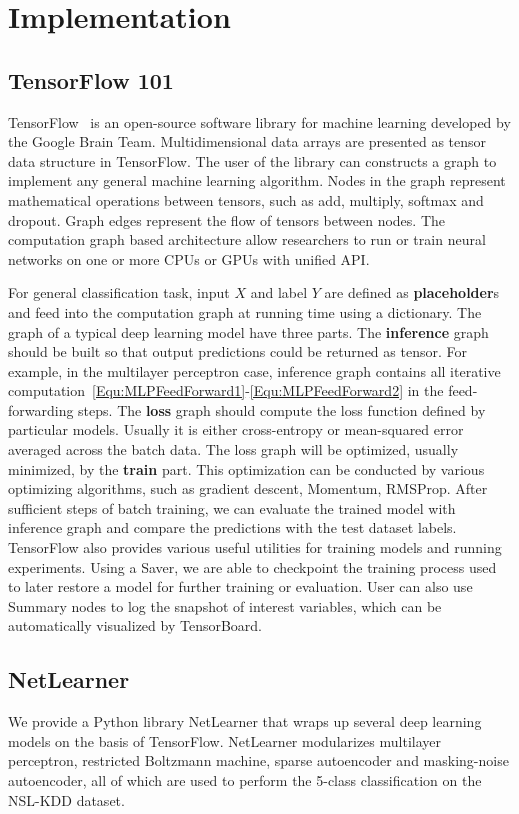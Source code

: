 \section{Implementation}

\subsection{TensorFlow 101}
TensorFlow~\cite{TensorFlow} is an open-source software library for machine learning developed by the Google Brain Team.
Multidimensional data arrays are presented as tensor data structure in TensorFlow.
The user of the library can constructs a graph to implement any general machine learning algorithm.
Nodes in the graph represent mathematical operations between tensors,
such as add, multiply, softmax and dropout.
Graph edges represent the flow of tensors between nodes.
The computation graph based architecture allow researchers to run or train neural networks
on one or more CPUs or GPUs with unified API.

For general classification task, input $X$ and label $Y$ are defined as \textbf{placeholder}s
and feed into the computation graph at running time using a dictionary.
The graph of a typical deep learning model have three parts.
The \textbf{inference} graph should be built so that output predictions could be returned as tensor.
For example, in the multilayer perceptron case, inference graph contains all iterative
computation~\ref{Equ:MLPFeedForward1}-\ref{Equ:MLPFeedForward2} in the feed-forwarding steps.
The \textbf{loss} graph should compute the loss function defined by particular models.
Usually it is either cross-entropy or mean-squared error averaged across the batch data.
The loss graph will be optimized, usually minimized, by the \textbf{train} part.
This optimization can be conducted by various optimizing algorithms, such as gradient descent,
Momentum, RMSProp.
After sufficient steps of batch training, we can evaluate the trained model with inference
graph and compare the predictions with the test dataset labels.
TensorFlow also provides various useful utilities for training models and running experiments.
Using a Saver, we are able to checkpoint the training process used to later restore a model for
further training or evaluation.
User can also use Summary nodes to log the snapshot of interest variables, which can be
automatically visualized by TensorBoard.

\subsection{NetLearner}
We provide a Python library NetLearner that wraps up several deep learning models on the basis of TensorFlow.
NetLearner modularizes multilayer perceptron, restricted Boltzmann machine, sparse autoencoder
and masking-noise autoencoder, all of which are used to perform the 5-class classification
on the NSL-KDD dataset.

